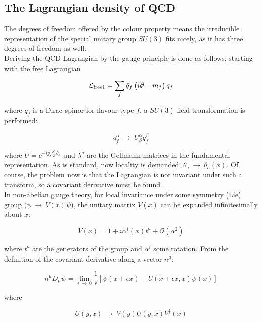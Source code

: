 \documentclass[10pt]{report}
\begin{document}
	\subsection{The Lagrangian density of QCD}
	The degrees of freedom offered by the colour property means the irreducible representation of the special unitary group $SU(3)$ fits nicely, as it has three degrees of freedom as well.\\
	
	Deriving the QCD Lagrangian by the gauge principle is done as follows; starting with the free Lagrangian
	
	\begin{equation}
	\mathcal{L}_{\text{free1}} = \sum_f \bar{q}_f\left(i\slashed \partial - m_f\right)q_f
	\end{equation}
	
	where $q_f$ is a Dirac spinor for flavour type $f$, a $SU(3)$ field transformation is performed:
	
	\begin{equation}
	q_f^\alpha \:\rightarrow\: U^\alpha_\beta q_f^\beta
	\end{equation} 
	
	where $U = e^{-ig_s\frac{\lambda^a}{2}\theta_a}$ and $\lambda^a$ are the Gellmann matrices in the fundamental representation. As is standard, now locality is demanded: $\theta_a \:\rightarrow\: \theta_a(x)$. Of course, the problem now is that the Lagrangian is not invariant under such a transform, so a covariant derivative must be found.\\
	In non-abelian gauge theory, for local invariance under some symmetry (Lie) group ($\psi \:\rightarrow\: V(x)\psi$), the unitary matrix $V(x)$ can be expanded infinitesimally about $x$:
	
	\begin{equation}
	V(x) = 1 + i\alpha^i(x)t^a + \mathcal{O}(\alpha^2)
	\end{equation}
	
	where $t^a$ are the generators of the group and $\alpha^i$ some rotation. From the definition of the covariant derivative along a vector $n^\mu$:
	
	\begin{equation}
	n^\mu D_\mu\psi = \lim_{\epsilon\:\rightarrow\:0} \frac{1}{\epsilon}\left[\psi(x+\epsilon x) - U(x+\epsilon x,x)\psi(x)\right]
	\label{Def_of_D}
	\end{equation}
	
	where
	
	\begin{equation}
	U(y,x) \:\rightarrow\: V(y)U(y,x)V^\dagger(x)
	\end{equation}
	
\end{document}
